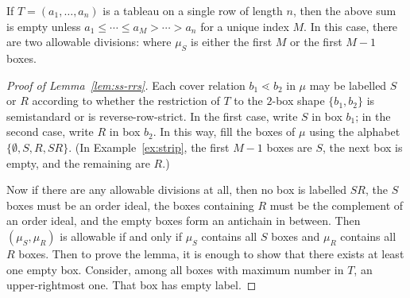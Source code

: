 \documentclass[ALCO,ThmDefs,Unicode,epreuves]{cedram}
\begin{document}
\begin{exam}\label{ex:strip}
If $T = (a_1,\ldots,a_n)$ is a tableau on a single row of length $n$, then the above sum is empty unless $a_1 \le \cdots \le a_M > \cdots > a_n$ for a unique index $M$. In this case, there are two allowable divisions: where $\mu_S$ is either the first $M$ or the first $M-1$ boxes.
\end{exam}

\begin{proof}[Proof of Lemma~\ref{lem:ss-rrs}]
Each cover relation $b_1 \lessdot b_2$ in $\mu$ may be labelled $S$ or $R$ according to whether the restriction of $T$ to the $2$-box shape $\{b_1,b_2\}$ is semistandard or is reverse-row-strict. In the first case, write $S$ in box $b_1$; in the second case, write $R$ in box $b_2$. In this way, fill the boxes of $\mu$ using the alphabet $\{\emptyset, S, R, SR\}$. (In Example~\ref{ex:strip}, the first $M-1$ boxes are $S$, the next box is empty, and the remaining are $R$.) 

Now if there are any allowable divisions at all, then no box is labelled $SR$, the $S$ boxes must be an order ideal, the boxes containing $R$ must be the complement of an order ideal, and the empty boxes form an antichain in between. Then $(\mu_S,\mu_R)$ is allowable if and only if $\mu_S$ contains all $S$ boxes and $\mu_R$ contains all $R$ boxes. Then to prove the lemma, it is enough to show that there exists at least one empty box. Consider, among all boxes with maximum number in $T$, an upper-rightmost one. That box has empty label.
\end{proof}



\nocite{*}


\end{document}
